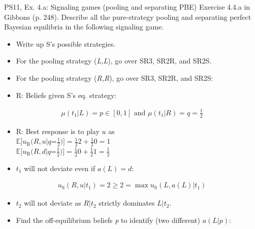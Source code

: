 \begin{frame}{PS11, Ex. 4.a: Signaling games (pooling and separating PBE)}
    Exercise 4.4.a in Gibbons (p. 248). Describe all the pure-strategy pooling and separating perfect Bayesian equilibria in the following signaling game.\vspace{-8pt}
    \begin{multicols}{2}
      \begin{itemize}
        \item[Step 1:] Write up S's possible strategies.
        \item[Step 2:] For the pooling strategy (\textit{L,L}), go over SR3, SR2R, and SR2S.
        \item[Step 3:] For the pooling strategy (\textit{R,R}), go over SR3, SR2R, and SR2S:
        \item[SR3:] R: Beliefs given S's eq. strategy:
      \end{itemize}\vspace{-10pt}
      \begin{align*}
        \mu(t_1|L)=p\in[0,1]\text{ and }\mu(t_1|R)=q=\frac{1}{2}
      \end{align*}\vspace{-18pt}
      \begin{itemize}
        \item[SR2R:] R: Best response is to play $u$ as\\
          $\mathbb{E}[u_\text{R}(R,u|q$=$\frac{1}{2})]=\frac{1}{2}2+\frac{1}{2}0=1$\\
          $\mathbb{E}[u_\text{R}(R,d|q$=$\frac{1}{2})]=\frac{1}{2}0+\frac{1}{2}1=\frac{1}{2}$
        \item[SR2S:] $t_1$ will not deviate even if $a(L)=d$:
      \end{itemize}\vspace{-10pt}
      \begin{align*}
        u_\text{S}(R,u|t_1)=2\geq2=\max u_\text{S}(L,a(L)|t_1)
      \end{align*}\vspace{-20pt}
      \begin{itemize}
        \item[] $t_2$ will not deviate as $R|t_2$ strictly dominates $L|t_2$.
        \item[PBE:] Find the off-equilibrium beliefs \textit{p} to identify (two different) $a(L|p)$:
      \end{itemize}\vspace{-10pt}
      \begin{align*}

\end{align*}
\end{multicols}
\end{frame}
